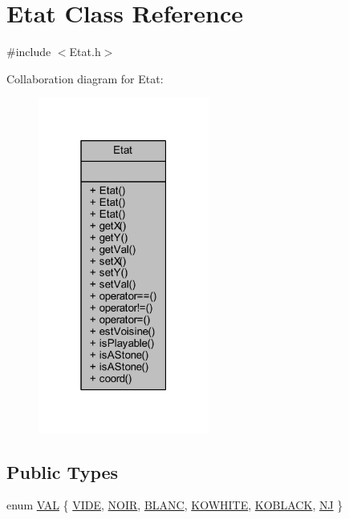 \hypertarget{class_etat}{}\section{Etat Class Reference}
\label{class_etat}


{\ttfamily \#include $<$Etat.\+h$>$}



Collaboration diagram for Etat\+:\nopagebreak
\begin{figure}[H]
\begin{center}
\leavevmode
\includegraphics[width=159pt]{class_etat__coll__graph}
\end{center}
\end{figure}
\subsection*{Public Types}
\begin{DoxyCompactItemize}
\item 
enum \hyperlink{class_etat_af3ddb2296ffc379b7f3ad2bf832f294e}{V\+AL} \{ \newline
\hyperlink{class_etat_af3ddb2296ffc379b7f3ad2bf832f294ea4811ee91e77f4300db04a9451fd0e0f0}{V\+I\+DE}, 
\hyperlink{class_etat_af3ddb2296ffc379b7f3ad2bf832f294ea6e8dd9025eff15a0d6a71268d7e34632}{N\+O\+IR}, 
\hyperlink{class_etat_af3ddb2296ffc379b7f3ad2bf832f294ea386cdf6b926ee1da9e6469350d5928c8}{B\+L\+A\+NC}, 
\hyperlink{class_etat_af3ddb2296ffc379b7f3ad2bf832f294ea9b3dd2418f67863f1da1da56f34fafff}{K\+O\+W\+H\+I\+TE}, 
\newline
\hyperlink{class_etat_af3ddb2296ffc379b7f3ad2bf832f294ea14f75cb5bd86150422cbf856df2d1e92}{K\+O\+B\+L\+A\+CK}, 
\hyperlink{class_etat_af3ddb2296ffc379b7f3ad2bf832f294ea91e6e22a0ee67bc1371a024e1b2ded64}{NJ}
 \}
\end{DoxyCompactItemize}
